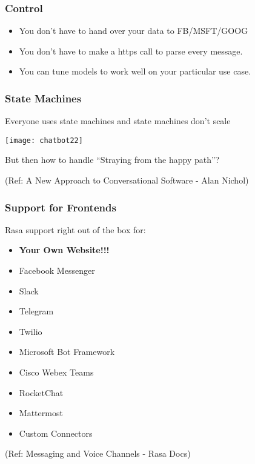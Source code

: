  \begin{frame}[fragile]\frametitle{Control}
\begin{itemize}
\item You don't have to hand over your data to FB/MSFT/GOOG
\item You don't have to make a https call to parse every message.
\item You can tune models to work well on your particular use case.
\end{itemize}
\end{frame}


 \begin{frame}[fragile]\frametitle{State Machines}
Everyone uses state machines and state machines don't scale


\begin{center}
\texttt{[image: chatbot22]}

\end{center}

But then how to handle ``Straying from the happy path''?

{\tiny (Ref: A New Approach to Conversational Software - Alan Nichol)}
\end{frame}

 \begin{frame}[fragile]\frametitle{Support for Frontends}
 Rasa support right out of the box for:
 \begin{itemize}
\item {\bf Your Own Website!!!}
\item Facebook Messenger
\item Slack
\item Telegram
\item Twilio
\item Microsoft Bot Framework
\item Cisco Webex Teams
\item RocketChat
\item Mattermost
\item Custom Connectors
\end{itemize}

{\tiny (Ref: Messaging and Voice Channels - Rasa Docs)}

\end{frame}

